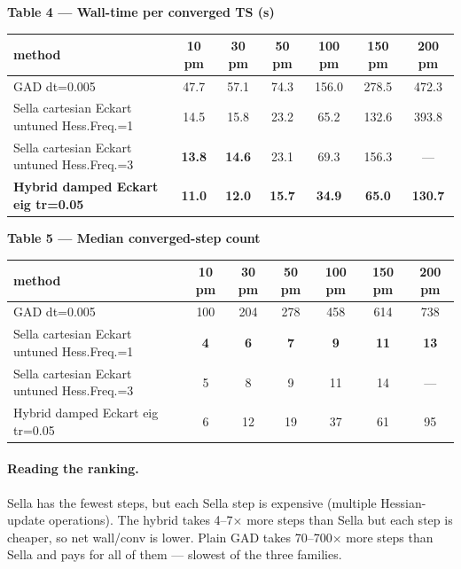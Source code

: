 \documentclass[11pt]{article}
\begin{document}
\begin{center}\footnotesize
\textbf{Table 4 — Wall-time per converged TS (s)}\\[0.3em]
\begin{tabular}{l|cccccc}
\toprule
\textbf{method} & \textbf{10 pm} & \textbf{30 pm} & \textbf{50 pm} & \textbf{100 pm} & \textbf{150 pm} & \textbf{200 pm} \\
\midrule
GAD dt=0.005                       & 47.7  & 57.1  & 74.3  & 156.0 & 278.5 & 472.3 \\
Sella cartesian Eckart untuned Hess.Freq.=1 & 14.5  & 15.8  & 23.2  & 65.2  & 132.6 & 393.8 \\
Sella cartesian Eckart untuned Hess.Freq.=3 & \textbf{13.8} & \textbf{14.6} & 23.1  & 69.3  & 156.3 & --- \\
\textbf{Hybrid damped Eckart eig tr=0.05} & \textbf{11.0} & \textbf{12.0} & \textbf{15.7} & \textbf{34.9} & \textbf{65.0} & \textbf{130.7} \\
\bottomrule
\end{tabular}
\end{center}

\begin{center}\footnotesize
\textbf{Table 5 — Median converged-step count}\\[0.3em]
\begin{tabular}{l|cccccc}
\toprule
\textbf{method} & \textbf{10 pm} & \textbf{30 pm} & \textbf{50 pm} & \textbf{100 pm} & \textbf{150 pm} & \textbf{200 pm} \\
\midrule
GAD dt=0.005                       & 100  & 204  & 278  & 458  & 614  & 738  \\
Sella cartesian Eckart untuned Hess.Freq.=1 & \textbf{4}    & \textbf{6}    & \textbf{7}    & \textbf{9}    & \textbf{11}   & \textbf{13}   \\
Sella cartesian Eckart untuned Hess.Freq.=3 & 5    & 8    & 9    & 11   & 14   & --- \\
Hybrid damped Eckart eig tr=0.05   & 6    & 12   & 19   & 37   & 61   & 95   \\
\bottomrule
\end{tabular}
\end{center}

\paragraph{Reading the ranking.} Sella has the fewest steps, but each
Sella step is expensive (multiple Hessian-update operations). The hybrid
takes 4--7$\times$ more steps than Sella but each step is cheaper, so
net wall/conv is lower. Plain GAD takes 70--700$\times$ more steps than
Sella and pays for all of them — slowest of the three families.
\end{document}
